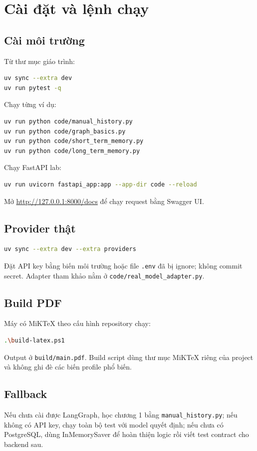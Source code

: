 \chapter{Cài đặt và lệnh chạy}
\label{app:setup}

\section{Cài môi trường}

Từ thư mục giáo trình:
\begin{lstlisting}[language=bash]
uv sync --extra dev
uv run pytest -q
\end{lstlisting}

Chạy từng ví dụ:
\begin{lstlisting}[language=bash]
uv run python code/manual_history.py
uv run python code/graph_basics.py
uv run python code/short_term_memory.py
uv run python code/long_term_memory.py
\end{lstlisting}

Chạy FastAPI lab:
\begin{lstlisting}[language=bash]
uv run uvicorn fastapi_app:app --app-dir code --reload
\end{lstlisting}

Mở \url{http://127.0.0.1:8000/docs} để chạy request bằng Swagger UI.

\section{Provider thật}

\begin{lstlisting}[language=bash]
uv sync --extra dev --extra providers
\end{lstlisting}

Đặt API key bằng biến môi trường hoặc file \texttt{.env} đã bị ignore; không commit secret. Adapter
tham khảo nằm ở \texttt{code/real\_model\_adapter.py}.

\section{Build PDF}

Máy có MiKTeX theo cấu hình repository chạy:
\begin{lstlisting}[language=bash]
.\build-latex.ps1
\end{lstlisting}

Output ở \texttt{build/main.pdf}. Build script dùng thư mục MiKTeX riêng của project và không ghi
đè các biến profile phổ biến.

\section{Fallback}

Nếu chưa cài được LangGraph, học chương 1 bằng \texttt{manual\_history.py}; nếu không có API key,
chạy toàn bộ test với model quyết định; nếu chưa có PostgreSQL, dùng InMemorySaver để hoàn thiện
logic rồi viết test contract cho backend sau.
